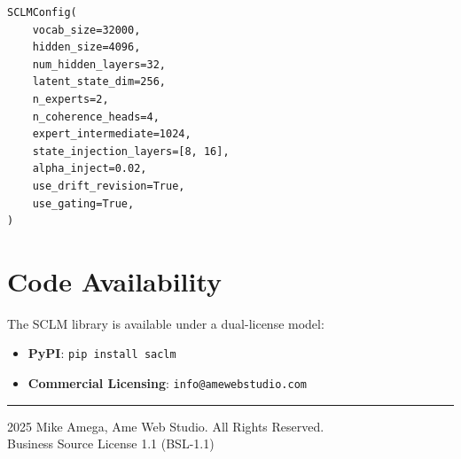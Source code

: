 \documentclass[11pt,a4paper]{article}
\begin{document}
\begin{lstlisting}
SCLMConfig(
    vocab_size=32000,
    hidden_size=4096,
    num_hidden_layers=32,
    latent_state_dim=256,
    n_experts=2,
    n_coherence_heads=4,
    expert_intermediate=1024,
    state_injection_layers=[8, 16],
    alpha_inject=0.02,
    use_drift_revision=True,
    use_gating=True,
)
\end{lstlisting}

\section{Code Availability}

The SCLM library is available under a dual-license model:

\begin{itemize}
    \item \textbf{PyPI}: \texttt{pip install saclm}
    \item \textbf{Commercial Licensing}: \texttt{info@amewebstudio.com}
\end{itemize}

\vspace{1cm}
\hrule
\vspace{0.5cm}
\begin{center}
\textcopyright{} 2025 Mike Amega, Ame Web Studio. All Rights Reserved.\\
Business Source License 1.1 (BSL-1.1)
\end{center}
\end{document}
